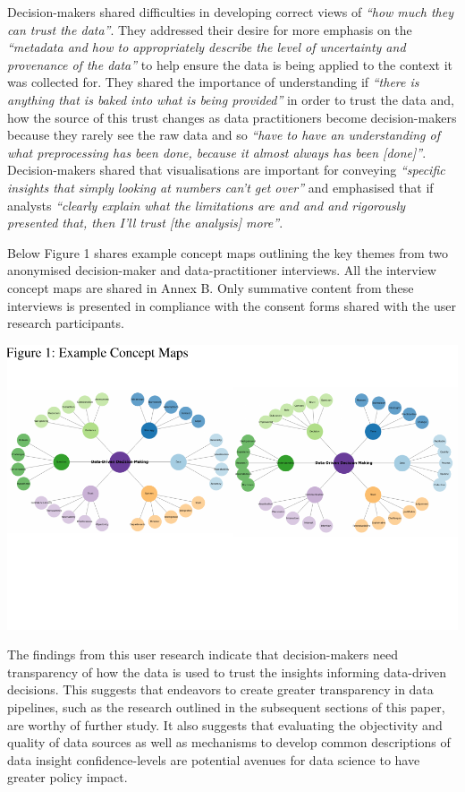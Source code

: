 \documentclass{article}
\begin{document}
Decision-makers shared difficulties in developing correct views of
\emph{``how much they can trust the data''}. They addressed their desire
for more emphasis on the \emph{``metadata and how to appropriately
describe the level of uncertainty and provenance of the data''} to help
ensure the data is being applied to the context it was collected for.
They shared the importance of understanding if \emph{``there is anything
that is baked into what is being provided''} in order to trust the data
and, how the source of this trust changes as data practitioners become
decision-makers because they rarely see the raw data and so \emph{``have
to have an understanding of what preprocessing has been done, because it
almost always has been {[}done{]}''}. Decision-makers shared that
visualisations are important for conveying \emph{``specific insights
that simply looking at numbers can't get over''} and emphasised that if
analysts \emph{``clearly explain what the limitations are and and and
rigorously presented that, then I'll trust {[}the analysis{]} more''}.

Below Figure 1 shares example concept maps outlining the key themes from
two anonymised decision-maker and data-practitioner interviews. All the
interview concept maps are shared in Annex B. Only summative content
from these interviews is presented in compliance with the consent forms
shared with the user research participants.

\includegraphics{210431461_CSC8639_Dissertation_files/figure-latex/ConceptMapExample-1.pdf}
\vspace{-3.3cm}

The findings from this user research indicate that decision-makers need
transparency of how the data is used to trust the insights informing
data-driven decisions. This suggests that endeavors to create greater
transparency in data pipelines, such as the research outlined in the
subsequent sections of this paper, are worthy of further study. It also
suggests that evaluating the objectivity and quality of data sources as
well as mechanisms to develop common descriptions of data insight
confidence-levels are potential avenues for data science to have greater
policy impact.
\end{document}
